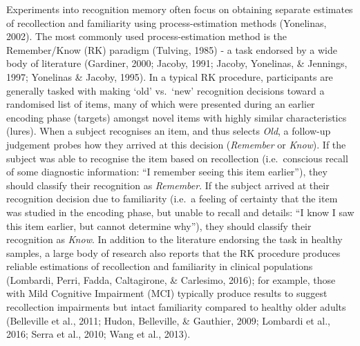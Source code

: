 \documentclass[
  11pt,
]{article}
\begin{document}
Experiments into recognition memory often focus on obtaining separate
estimates of recollection and familiarity using process-estimation
methods (Yonelinas, 2002). The most commonly used process-estimation
method is the Remember/Know (RK) paradigm (Tulving, 1985) - a task
endorsed by a wide body of literature (Gardiner, 2000; Jacoby, 1991;
Jacoby, Yonelinas, \& Jennings, 1997; Yonelinas \& Jacoby, 1995). In a
typical RK procedure, participants are generally tasked with making
`old' vs.~`new' recognition decisions toward a randomised list of items,
many of which were presented during an earlier encoding phase (targets)
amongst novel items with highly similar characteristics (lures). When a
subject recognises an item, and thus selects \emph{Old}, a follow-up
judgement probes how they arrived at this decision (\emph{Remember} or
\emph{Know}). If the subject was able to recognise the item based on
recollection (i.e.~conscious recall of some diagnostic information: ``I
remember seeing this item earlier''), they should classify their
recognition as \emph{Remember}. If the subject arrived at their
recognition decision due to familiarity (i.e.~a feeling of certainty
that the item was studied in the encoding phase, but unable to recall
and details: ``I know I saw this item earlier, but cannot determine
why''), they should classify their recognition as \emph{Know}. In
addition to the literature endorsing the task in healthy samples, a
large body of research also reports that the RK procedure produces
reliable estimations of recollection and familiarity in clinical
populations (Lombardi, Perri, Fadda, Caltagirone, \& Carlesimo, 2016);
for example, those with Mild Cognitive Impairment (MCI) typically
produce results to suggest recollection impairments but intact
familiarity compared to healthy older adults (Belleville et al., 2011;
Hudon, Belleville, \& Gauthier, 2009; Lombardi et al., 2016; Serra et
al., 2010; Wang et al., 2013).

~
\end{document}
